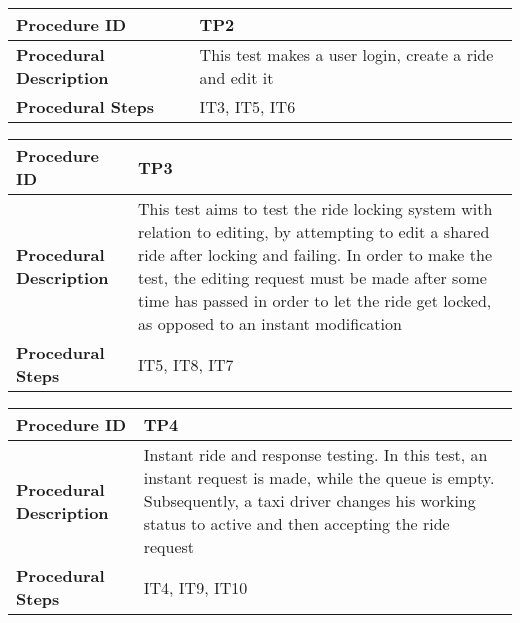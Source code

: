 \noindent\begin{tabular}{l p{}}
    \hline
    \textbf{Procedure ID} & \textbf{TP2}\\
    \hline
    \textbf{Procedural Description} & This test makes a user login, create a ride and edit it\\
    \hline
    \textbf{Procedural Steps} & IT3, IT5, IT6\\
\end{tabular}

\noindent\begin{tabular}{l p{}}
    \hline
    \textbf{Procedure ID} & \textbf{TP3}\\
    \hline
    \textbf{Procedural Description} & This test aims to test the ride locking system with relation to editing, by attempting to edit a shared ride after locking and failing.
		In order to make the test, the editing request must be made after some time has passed in order to let the ride get locked, as opposed to an instant modification\\
    \hline
    \textbf{Procedural Steps} & IT5, IT8, IT7\\
\end{tabular}

\noindent\begin{tabular}{l p{}}
    \hline
    \textbf{Procedure ID} & \textbf{TP4}\\
    \hline
    \textbf{Procedural Description} & Instant ride and response testing. In this test, an instant request is made, while the queue is empty. Subsequently, a taxi driver changes his
		working status to active and then accepting the ride request\\
    \hline
    \textbf{Procedural Steps} & IT4, IT9, IT10\\
\end{tabular}
